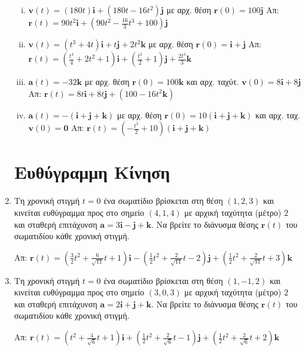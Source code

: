 \documentclass[a4paper,table]{report}
\begin{document}
\begin{enumerate}
\begin{enumerate}[i)]
      \item $ \mathbf{v}(t) =(180t) \mathbf{i}+(180t-16t^{2}) \mathbf{j} $ με αρχ. 
        θέση $ \mathbf{r}(0)=100 \mathbf{j} $
        \hfill Απ: $ \mathbf{r}(t) = 90t^{2} \mathbf{i}+(90t^{2}- \frac{16}{3} t^{3}+100)
        \mathbf{j} $ 

      \item $ \mathbf{v}(t) = (t^{3}+4t) \mathbf{i} +t \mathbf{j}+2t^{2} \mathbf{k} $ 
        με αρχ. θέση $ \mathbf{r}(0) = \mathbf{i}+ \mathbf{j} $
        \hfill Απ: $ \mathbf{r}(t) = (\frac{t^{4}}{4} + 2t^{2}+1) \mathbf{i}+
        (\frac{t^{2}}{2}+1) \mathbf{j}+ \frac{2t^{3}}{3} \mathbf{k} $  

      \item $ \mathbf{a}(t) = -32 \mathbf{k} $ με αρχ. θέση $ \mathbf{r}(0) = 100
        \mathbf{k} $ και αρχ. ταχύτ. $ \mathbf{v}(0)=8 \mathbf{i}+8 \mathbf{j} $
        \hfill Απ: $ \mathbf{r}(t) = 8t \mathbf{i} +8t \mathbf{j}+ (100-16t^{2}
        \mathbf{k}) $ 

      \item $ \mathbf{a}(t) = -(\mathbf{i}+ \mathbf{j}+ \mathbf{k}) $ με 
        αρχ. θέση $ \mathbf{r}(0) = 10 (\mathbf{i}+\mathbf{j}+\mathbf{k}) $ 
        και αρχ. ταχ. $ \mathbf{v}(0)= \mathbf{0}$ 
        \hfill Απ: $ \mathbf{r}(t) = (- \frac{t^{2}}{2} +10) (\mathbf{i}+  \mathbf{j}+  
        \mathbf{k}) $ 
    \end{enumerate}

    \section*{Ευθύγραμμη Κίνηση}
    
  \item Τη χρονική στιγμή $t=0$ ένα σωματίδιο βρίσκεται στη θέση $ (1,2,3) $ και 
    κινείται ευθύγραμμα προς στο σημείο $ (4,1,4) $ με αρχική ταχύτητα (μέτρο) $ 2 $ 
    και σταθερή επιτάχυνση $ \mathbf{a}= 3 \mathbf{i}- \mathbf{j}+ \mathbf{k} $. 
    Να βρείτε το διάνυσμα θέσης $ \mathbf{r}(t) $ του σωματιδίου κάθε χρονική στιγμή.

    \hfill Απ: $ \mathbf{r}(t)=(\frac{3}{2} t^{2}+ \frac{6}{\sqrt{11}} t+1)
    \mathbf{i}-(\frac{1}{2} t^{2}+ \frac{2}{\sqrt{11}} t-2) \mathbf{j}+
    (\frac{1}{2} t^{2}+ \frac{2}{\sqrt{11}}t+3) \mathbf{k} $ 

  \item Τη χρονική στιγμή $t=0$ ένα σωματίδιο βρίσκεται στη θέση $ (1,-1,2) $ και 
    κινείται ευθύγραμμα προς στο σημείο $ (3,0,3) $ με αρχική ταχύτητα (μέτρο) $ 2 $ 
    και σταθερή επιτάχυνση $ \mathbf{a}= 2 \mathbf{i}+ \mathbf{j}+ \mathbf{k} $. 
    Να βρείτε το διάνυσμα θέσης $ \mathbf{r}(t) $ του σωματιδίου κάθε χρονική στιγμή.

    \hfill Απ: $ \mathbf{r}(t) = (t^{2}+ \frac{4}{\sqrt{6}} t+1)
    \mathbf{i}+(\frac{1}{2} t^{2}+ \frac{2}{\sqrt{6}} t-1)
    \mathbf{j}+(\frac{1}{2} t^{2}+ \frac{2}{\sqrt{6}} t+2) \mathbf{k} $ 
\end{enumerate}
\end{document}

